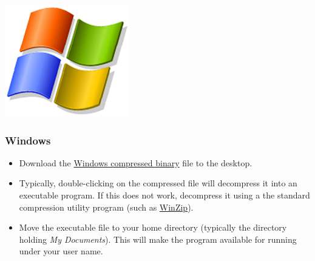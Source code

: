 \begin{flushleft}
	\begin{minipage}[c]{0.074\textwidth}
	   	\includegraphics[width=\textwidth]{figures/figLogoWindows.jpg}
	\end{minipage}
	\quad
	\begin{minipage}[t]{0.88\textwidth}
		   	\subsubsection{Windows}
	\end{minipage}
		\begin{itemize}
			\item
                Download the
                \href{http://research.amnh.org/scicomp/projects/poy.php}{Windows compressed binary} file to the desktop.

			\item 
                Typically, double-clicking on the compressed file will
                decompress it into an executable program. If this does not
                work, decompress it using a the standard compression utility program
                (such as \href{http://www.gnu.org/software/emacs/}{WinZip}).

			\item
                Move the executable file to your home directory (typically the
                directory holding \emph{My Documents}). This will make the program
                available for running under your user name.
		\end{itemize}


\end{flushleft}
